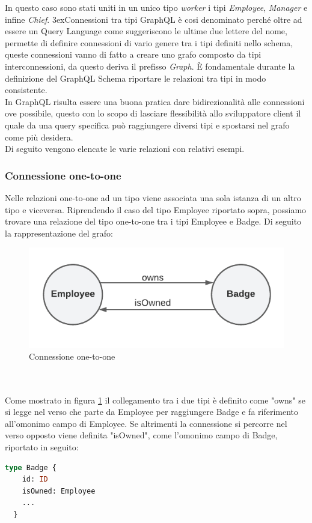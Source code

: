 In questo caso sono stati uniti in un unico tipo \textit{worker} i tipi \textit{Employee}, \textit{Manager} e infine \textit{Chief}.
3ex{Connessioni tra tipi}
GraphQL è cosi denominato perché oltre ad essere un Query Language come suggeriscono le ultime due lettere del nome, permette di definire connessioni di vario genere tra i tipi definiti nello schema, queste connessioni vanno di fatto a creare uno grafo composto da tipi interconnessioni, da questo deriva il prefisso \textit{Graph}.
È fondamentale durante la definizione del GraphQL Schema riportare le relazioni tra tipi in modo consistente. \\
In GraphQL risulta essere una buona pratica dare bidirezionalità alle connessioni ove possibile, questo con lo scopo di lasciare flessibilità allo sviluppatore client il quale da una query specifica può raggiungere diversi tipi e spostarsi nel grafo come più desidera.\\
Di seguito vengono elencate le varie relazioni con relativi esempi.
\subsubsection*{Connessione one-to-one}
Nelle relazioni one-to-one ad un tipo viene associata una sola istanza di un altro tipo e viceversa. Riprendendo il caso del tipo Employee riportato sopra, possiamo trovare una relazione del tipo one-to-one tra i tipi Employee e Badge. Di seguito la rappresentazione del grafo:
\begin{figure}[!h]
\centering
\includegraphics[width=0.5\linewidth]{immagini/one_to_one.pdf}
\caption{Connessione one-to-one}
\label{one-to-one}
\end{figure}
\\ \\
Come mostrato in figura \ref{one-to-one} il collegamento tra i due tipi è definito come "owns" se si legge nel verso che parte da Employee per raggiungere Badge e fa riferimento all'omonimo campo di Employee. Se altrimenti la connessione si percorre nel verso opposto viene definita "isOwned", come l'omonimo campo di Badge, riportato in seguito:
\begin{lstlisting}[language=GraphQL,]
  type Badge {
    id: ID
    isOwned: Employee
    ...
  }
\end{lstlisting}
